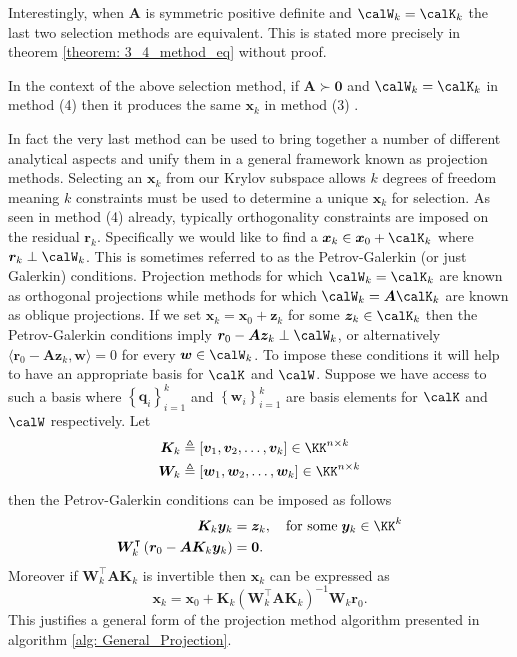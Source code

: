 Interestingly, when $\bm{A}$ is symmetric positive definite and $\calW_k = \calK_k$ the last two selection methods are equivalent. This is stated more precisely in theorem \ref{theorem: 3_4_method_eq} without proof.

\begin{thm} \label{theorem: 3_4_method_eq}
    In the context of the above selection method, if $\bm{A} \succ \bm{0}$ and $\calW_k = \calK_k$ in method (4) then it produces the same $\bm{x}_k$ in method (3) \cite{DemmelJamesW1997Anla}.
\end{thm}

In fact the very last method can be used to bring together a number of different analytical aspects and unify them in a general framework known as projection methods. Selecting an $\bm{x}_k$ from our Krylov subspace allows $k$ degrees of freedom meaning $k$ constraints must be used to determine a unique $\bm{x}_k$ for selection. As seen in method (4) already, typically orthogonality constraints are imposed on the residual $\bm{r}_k$. Specifically we would like to find a $\bm{x}_k \in \bm{x}_0 + \calK_k$ where $\bm{r}_k \perp \calW_k$. This is sometimes referred to as the Petrov-Galerkin (or just Galerkin) conditions. Projection methods for which $\calW_k = \calK_k$ are known as orthogonal projections while methods for which $\calW_k = \bm{A} \calK_k$ are known as oblique projections. If we set $\bm{x}_k = \bm{x}_0 + \bm{z}_k$ for some $\bm{z}_k \in \calK_k$ then the Petrov-Galerkin conditions imply $\bm{r}_0 - \bm{A} \bm{z}_k \perp \calW_k$, or alternatively $\langle \bm{r}_0 - \bm{A} \bm{z}_k , \bm{w} \rangle = 0$ for every $\bm{w} \in \calW_k$. To impose these conditions it will help to have an appropriate basis for $\calK$ and $\calW$. Suppose we have access to such a basis where $\left\{ \bm{q}_i \right\}_{i=1}^{k}$ and $\left\{ \bm{w}_i \right\}_{i=1}^{k}$ are basis elements for $\calK$ and $\calW$ respectively. Let
\begin{align*}
    \bm{K}_k & \triangleq \left[ \bm{v}_1 , \bm{v}_2 , \ldots , \bm{v}_k \right] \in \KK^{n \times k} \\
    \bm{W}_k & \triangleq \left[ \bm{w}_1 , \bm{w}_2 , \ldots , \bm{w}_k \right] \in \KK^{n \times k}
\end{align*}
then the Petrov-Galerkin conditions can be imposed as follows
\begin{align*}
    \bm{K}_k \bm{y}_k                                                       & = \bm{z}_k , \quad \text{for some} \; \bm{y}_k \in \KK^k \\
    \bm{W}_k^{\intercal} \left( \bm{r}_0 - \bm{A} \bm{K}_k \bm{y}_k \right) & = \bm{0}.
\end{align*}
Moreover if $\bm{W}_k^{\intercal} \bm{A} \bm{K}_k$ is invertible then $\bm{x}_k$ can be expressed as
\begin{equation} \label{eq: expr_x_Petrov_Galerkin_1}
    \bm{x}_k = \bm{x}_0 + \bm{K}_k \left( \bm{W}_k^{\intercal} \bm{A} \bm{K}_k \right)^{-1} \bm{W}_k \bm{r}_0.
\end{equation}
This justifies a general form of the projection method algorithm presented in algorithm \ref{alg: General_Projection}.

